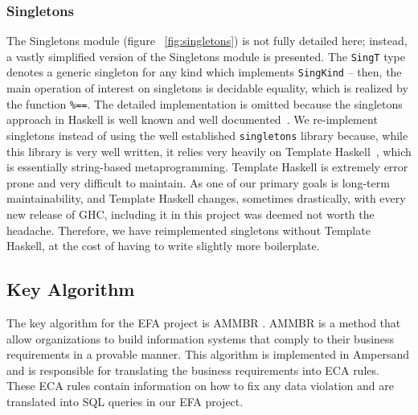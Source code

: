 \documentclass[12pt, svgnames]{article}
\let\Oldsubsection\subsection
\renewcommand{\subsection}{\FloatBarrier\Oldsubsection}
\let\Oldsubsubsection\subsubsection
\renewcommand{\subsubsection}{\FloatBarrier\Oldsubsubsection}
\begin{document}
\Oldsubsubsection{Singletons}\label{subsec:Singletons}

The Singletons module (figure ~\ref{fig:singletons}) is not fully detailed here;
instead, a vastly simplified version of the Singletons module is presented. The
\lstinline{SingT} type denotes a generic singleton for any kind which implements
\lstinline{SingKind} -- then, the main operation of interest on singletons is
decidable equality, which is realized by the function \lstinline{%==}. The
  detailed implementation is omitted because the singletons approach in Haskell
  is well known and well documented~\cite{singletons}. We re-implement
  singletons instead of using the well established \texttt{singletons} library
  because, while this library is very well written, it relies very heavily on
  Template Haskell~\cite{th}, which is essentially string-based
  metaprogramming. Template Haskell is extremely error prone and very difficult
  to maintain. As one of our primary goals is long-term maintainability, and
  Template Haskell changes, sometimes drastically, with every new release of
  GHC, including it in this project was deemed not worth the
  headache. Therefore, we have reimplemented singletons without Template
  Haskell, at the cost of having to write slightly more boilerplate.


\subsection{Key Algorithm}
The key algorithm for the EFA project is AMMBR \cite{AMMBR}. AMMBR is a method 
that allow organizations to build information systems that comply to their 
business requirements in a provable manner. This algorithm is implemented in 
Ampersand and is responsible for translating the business requirements into ECA 
rules. These ECA rules contain information on how to fix any data violation and 
are translated into SQL queries in our EFA project.
\end{document}
